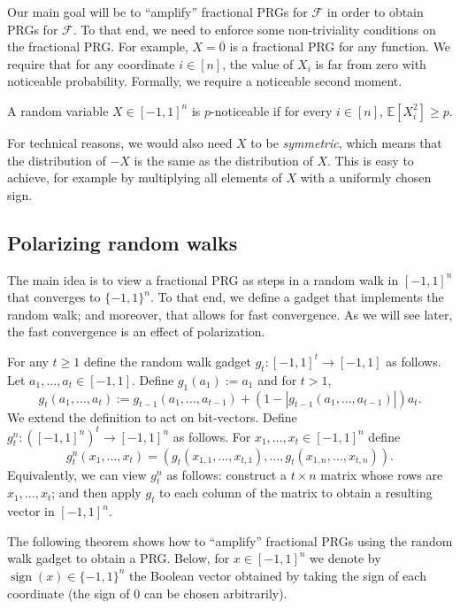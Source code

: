 \documentclass{toc}
\newcommand{\E}{\mathbb{E}}
\newcommand{\FF}{\mathcal{F}}
\DeclareMathOperator{\sign}{sign}     %
\newcommand{\zero}{\overline{0}}
\begin{document}
Our main goal will be to ``amplify'' fractional PRGs for $\FF$ in order to obtain PRGs for $\FF$. To that end, we need to enforce some non-triviality
conditions on the fractional PRG\@. For example, $X=\zero$ is a fractional PRG for any function. We require that for any coordinate $i \in [n]$,
the value of $X_i$ is far from zero with noticeable probability. Formally, we require a noticeable second moment.

\begin{definition}
A random variable $X \in [-1,1]^n$ is $p$-noticeable if for every $i \in [n]$, $\E[X_i^2] \ge p$.
\end{definition}

For technical reasons, we would also need $X$ to be \emph{symmetric}, which means that the distribution of $-X$ is the same
as the distribution of $X$. This is easy to achieve, for example by multiplying all elements of $X$ with a uniformly chosen sign.

\subsection{Polarizing random walks}
The main idea is to view a fractional PRG as steps in a random walk in $[-1,1]^n$ that converges to $\{-1,1\}^n$.
To that end, we define a gadget that implements the random walk; and moreover, that allows for fast convergence. As we will see later, the fast convergence is an effect of polarization.


\begin{definition}
For any $t \ge 1$ define the random walk gadget $g_t:[-1,1]^t \to [-1,1]$ as follows.
Let $a_1,\ldots,a_t \in [-1,1]$.
Define $g_1(a_1):=a_1$ and for $t>1$,
$$
g_t(a_1,\ldots,a_t) := g_{t-1}(a_1,\ldots,a_{t-1}) + (1-|g_{t-1}(a_1,\ldots,a_{t-1})|) a_t.
$$
We extend the definition to act on bit-vectors.
Define $g_t^n:([-1,1]^n)^t \to [-1,1]^n$ as follows. For $x_1,\ldots,x_t \in [-1,1]^n$ define
$$
g_t^n(x_1,\ldots,x_t) = \left(g_t(x_{1,1},\ldots,x_{t,1}),\ldots,g_t(x_{1,n},\ldots,x_{t,n})\right).
$$
Equivalently, we can view $g_t^n$ as follows: construct a $t \times n$ matrix whose rows are $x_1,\ldots,x_t$; and
then apply $g_t$ to each column of the matrix to obtain a resulting vector in $[-1,1]^n$.
\end{definition}

The following theorem shows how to ``amplify'' fractional PRGs using the random walk gadget to obtain a PRG\@.
Below, for $x \in [-1,1]^n$ we denote by $\sign(x) \in \{-1,1\}^n$ the Boolean vector obtained by taking
the sign of each coordinate (the sign of $0$ can be chosen arbitrarily).
\end{document}

